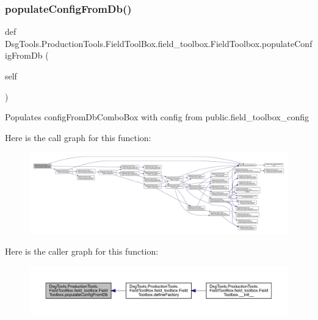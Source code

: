 \subsubsection{\texorpdfstring{populate\+Config\+From\+Db()}{populateConfigFromDb()}}
{\footnotesize\ttfamily def Dsg\+Tools.\+Production\+Tools.\+Field\+Tool\+Box.\+field\+\_\+toolbox.\+Field\+Toolbox.\+populate\+Config\+From\+Db (\begin{DoxyParamCaption}\item[{}]{self }\end{DoxyParamCaption})}

\begin{DoxyVerb}Populates configFromDbComboBox with config from public.field_toolbox_config
\end{DoxyVerb}
 Here is the call graph for this function\+:
\nopagebreak
\begin{figure}[H]
\begin{center}
\leavevmode
\includegraphics[width=350pt]{class_dsg_tools_1_1_production_tools_1_1_field_tool_box_1_1field__toolbox_1_1_field_toolbox_a9fbe4ec85e2198e9a371582c01daf93b_cgraph}
\end{center}
\end{figure}
Here is the caller graph for this function\+:
\nopagebreak
\begin{figure}[H]
\begin{center}
\leavevmode
\includegraphics[width=350pt]{class_dsg_tools_1_1_production_tools_1_1_field_tool_box_1_1field__toolbox_1_1_field_toolbox_a9fbe4ec85e2198e9a371582c01daf93b_icgraph}
\end{center}
\end{figure}
\mbox{\label{class_dsg_tools_1_1_production_tools_1_1_field_tool_box_1_1field__toolbox_1_1_field_toolbox_a8faeaf01b5665f0b0c37fbc77024ab1c}} 
